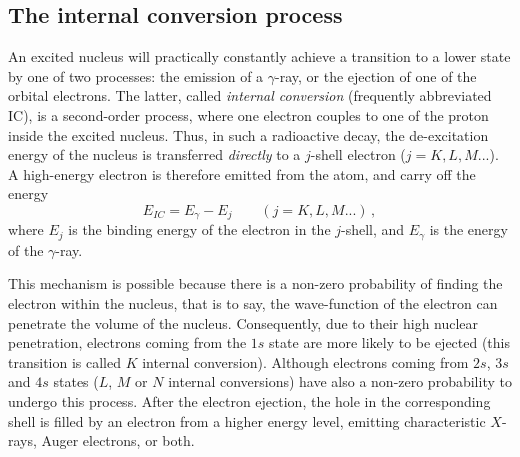 \subsection{The internal conversion process}

An excited nucleus will practically constantly achieve a transition to a lower state by one of two processes: the emission of a $\gamma$-ray, or the ejection of one of the orbital electrons.
The latter, called \emph{internal conversion} (frequently abbreviated IC), is a second-order process, where one electron couples to one of the proton inside the excited nucleus.
Thus, in such a radioactive decay, the de-excitation energy of the nucleus is transferred \emph{directly} to a $j$-shell electron ($j=K,L,M...$).
A high-energy electron is therefore emitted from the atom, and carry off the energy
\begin{equation}
E_{IC} = E_{\gamma}-E_{j}\qquad (j=K,L,M...)\,,
\end{equation}
where $E_{j}$ is the binding energy of the electron in the $j$-shell, and $E_{\gamma}$ is the energy of the $\gamma$-ray.

This mechanism is possible because there is a non-zero probability of finding the electron within the nucleus, that is to say, the wave-function of the electron can penetrate the volume of the nucleus.
Consequently, due to their high nuclear penetration, electrons coming from the $1s$ state are more likely to be ejected (this transition is called $K$ internal conversion).
Although electrons coming from $2s$, $3s$ and $4s$ states ($L$, $M$ or $N$ internal conversions) have also a non-zero probability to undergo this process.
After the electron ejection, the hole in the corresponding shell is filled by an electron from a higher energy level, emitting characteristic $X$-rays, Auger electrons, or both.

